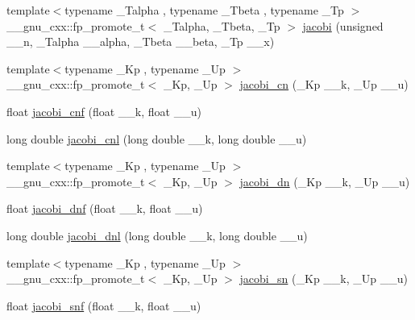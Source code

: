 \begin{DoxyCompactItemize}
\item 
{\footnotesize template$<$typename \+\_\+\+Talpha , typename \+\_\+\+Tbeta , typename \+\_\+\+Tp $>$ }\\\+\_\+\+\_\+gnu\+\_\+cxx\+::fp\+\_\+promote\+\_\+t$<$ \+\_\+\+Talpha, \+\_\+\+Tbeta, \+\_\+\+Tp $>$ \hyperlink{group__gnu__math__spec__func_gad54f6601748324d268532138eb38ca33}{jacobi} (unsigned \+\_\+\+\_\+n, \+\_\+\+Talpha \+\_\+\+\_\+alpha, \+\_\+\+Tbeta \+\_\+\+\_\+beta, \+\_\+\+Tp \+\_\+\+\_\+x)
\item 
{\footnotesize template$<$typename \+\_\+\+Kp , typename \+\_\+\+Up $>$ }\\\+\_\+\+\_\+gnu\+\_\+cxx\+::fp\+\_\+promote\+\_\+t$<$ \+\_\+\+Kp, \+\_\+\+Up $>$ \hyperlink{group__gnu__math__spec__func_ga2e1c43b232d378164bed1433041ca7dc}{jacobi\+\_\+cn} (\+\_\+\+Kp \+\_\+\+\_\+k, \+\_\+\+Up \+\_\+\+\_\+u)
\item 
float \hyperlink{group__gnu__math__spec__func_gadbd6320123f45ae10d539cf8df0373cd}{jacobi\+\_\+cnf} (float \+\_\+\+\_\+k, float \+\_\+\+\_\+u)
\item 
long double \hyperlink{group__gnu__math__spec__func_ga08892965ea520116cc53a764513fe685}{jacobi\+\_\+cnl} (long double \+\_\+\+\_\+k, long double \+\_\+\+\_\+u)
\item 
{\footnotesize template$<$typename \+\_\+\+Kp , typename \+\_\+\+Up $>$ }\\\+\_\+\+\_\+gnu\+\_\+cxx\+::fp\+\_\+promote\+\_\+t$<$ \+\_\+\+Kp, \+\_\+\+Up $>$ \hyperlink{group__gnu__math__spec__func_ga0f8fa8d6a77dbc2089d65f3f16876aa9}{jacobi\+\_\+dn} (\+\_\+\+Kp \+\_\+\+\_\+k, \+\_\+\+Up \+\_\+\+\_\+u)
\item 
float \hyperlink{group__gnu__math__spec__func_gae96327d678adc6b5c4051f1c3649549a}{jacobi\+\_\+dnf} (float \+\_\+\+\_\+k, float \+\_\+\+\_\+u)
\item 
long double \hyperlink{group__gnu__math__spec__func_gae59786991abbf8359deef49b6323065a}{jacobi\+\_\+dnl} (long double \+\_\+\+\_\+k, long double \+\_\+\+\_\+u)
\item 
{\footnotesize template$<$typename \+\_\+\+Kp , typename \+\_\+\+Up $>$ }\\\+\_\+\+\_\+gnu\+\_\+cxx\+::fp\+\_\+promote\+\_\+t$<$ \+\_\+\+Kp, \+\_\+\+Up $>$ \hyperlink{group__gnu__math__spec__func_ga49d5e18152dd0dd0f496b8c8582e7045}{jacobi\+\_\+sn} (\+\_\+\+Kp \+\_\+\+\_\+k, \+\_\+\+Up \+\_\+\+\_\+u)
\item 
float \hyperlink{group__gnu__math__spec__func_ga5981245b7343da6e21d445bb01fdba9c}{jacobi\+\_\+snf} (float \+\_\+\+\_\+k, float \+\_\+\+\_\+u)

\end{DoxyCompactItemize}
